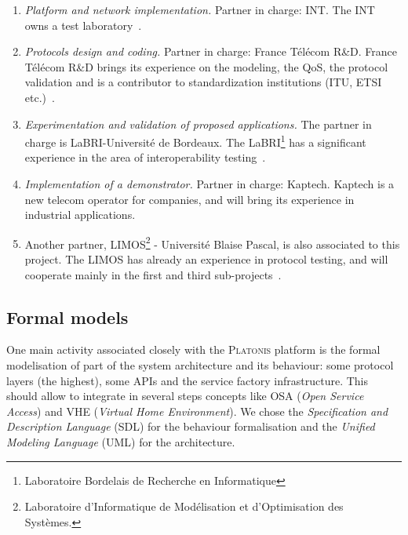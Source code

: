   \begin{enumerate}

  \item \emph{Platform and network implementation.}  Partner in
    charge: INT. The INT owns a test laboratory~\cite{besse,ASE,hit}.

  \item \emph{Protocols design and coding.}  Partner in charge: France
    T\'el\'ecom R\&D. France T\'el\'ecom R\&D brings its experience on
    the modeling, the QoS, the protocol validation and is a
    contributor to standardization institutions (ITU, ETSI
    etc.)~\cite{Alabau,Monin}.

  \item \emph{Experimentation and validation of proposed
      applications.}  The partner in charge is LaBRI-Universit\'e de
    Bordeaux. The LaBRI\footnote{Laboratoire Bordelais de Recherche en
      Informatique} has a significant experience in the area of
    interoperability testing~\cite{kone,castanet,rafiq}.

  \item \emph{Implementation of a demonstrator.}  Partner in charge:
    Kaptech. Kaptech is a new telecom operator for companies, and will
    bring its experience in industrial applications.

  \item Another partner, LIMOS\footnote{Laboratoire d'Informatique de
      Mod\'elisation et d'Optimisation des Syst\`emes.} - Universit\'e
    Blaise Pascal, is also associated to this project. The LIMOS has
    already an experience in protocol testing, and will cooperate
    mainly in the first and third sub-projects~\cite{laurencot}.

  \end{enumerate}



\subsection{Formal models}
   
One main activity associated closely with the \textsc{Platonis}
platform is the formal modelisation of part of the system architecture
and its behaviour: some protocol layers (the highest), some APIs and
the service factory infrastructure. This should allow to integrate in
several steps concepts like OSA (\emph{Open Service Access}) and VHE
(\emph{Virtual Home Environment}). We chose the \emph{Specification
  and Description Language} (SDL) for the behaviour formalisation and
the \emph{Unified Modeling Language} (UML) for the architecture.

